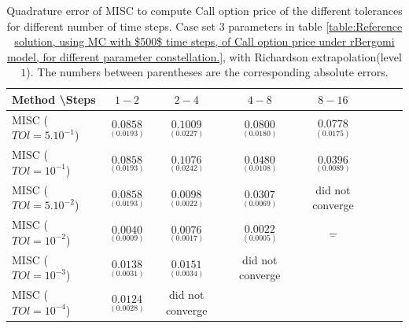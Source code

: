 \documentclass[11pt]{article}
\begin{document}
\begin{table}[h!]
\centering
\begin{tabular}{l*{6}{c}r}
Method \textbackslash  Steps            & $1-2$ & $2-4$ & $4-8$ & $8-16$  \\
\hline
MISC ($TOl=5.10^{-1}$)  & $\underset{(  0.0193)}{\mathbf{ 0.0858}}$ & $\underset{(0.0227)}{\mathbf{   0.1009}}$ & $\underset{(0.0180)}{\mathbf{  0.0800}}$ & $\underset{(  0.0175
	)}{\mathbf{ 0.0778
}}$ \\
MISC ($TOl=10^{-1}$)  & $\underset{(  0.0193)}{\mathbf{ 0.0858}}$& $\underset{(0.0242
	)}{\mathbf{    0.1076}}$ & $\underset{(0.0108)}{\mathbf{
		0.0480}}$ & $\underset{( 0.0089)}{\mathbf{0.0396}}$  \\
MISC ($TOl=5.10^{-2}$)  & $\underset{(  0.0193)}{\mathbf{ 0.0858}}$ & $\underset{(
	0.0022)}{\mathbf{ 0.0098}}$ & $\underset{( 0.0069)}{\mathbf{
		0.0307}}$ & did not converge \\
MISC ($TOl=10^{-2}$)  & $\underset{ (0.0009)}{\mathbf{0.0040}}$ & $\underset{(0.0017)}{\mathbf{0.0076}}$ & $\underset{(0.0005)}{\mathbf{0.0022}}$ & $\underset{-}{\mathbf{-}}$  \\
MISC ($TOl=10^{-3}$)  & $\underset{ (0.0031)}{\mathbf{0.0138}}$ &      $\underset{ ( 0.0034)}{\mathbf{ 0.0151}}$
& did not converge&\\
MISC ($TOl=10^{-4}$)  & $\underset{ (0.0028)}{\mathbf{0.0124}}$ &did not converge&&\\
\hline
\end{tabular}
\caption{Quadrature error of MISC to compute Call option price of the different tolerances for different number of time steps. Case set $3$ parameters in table \ref{table:Reference solution, using MC with $500$ time steps, of Call option price under rBergomi model, for different parameter constellation.}, with Richardson extrapolation(level $1$). The numbers between parentheses are the corresponding absolute errors.}
\label{Quadrature error of MISC to compute Call option price of the different tolerances for different number of time steps. Case set $3$ parameters, with Richardson extrapolation(level $1$). The numbers between parentheses are the corresponding absolute errors.}
\end{table}
\end{document}
